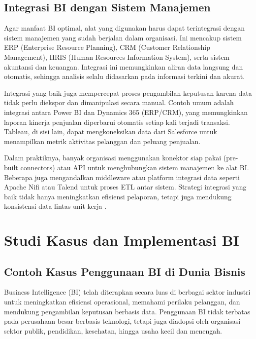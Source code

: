 \subsection{Integrasi BI dengan Sistem Manajemen}

Agar manfaat BI optimal, alat yang digunakan harus dapat terintegrasi dengan sistem manajemen yang sudah berjalan dalam organisasi. Ini mencakup sistem ERP (Enterprise Resource Planning), CRM (Customer Relationship Management), HRIS (Human Resources Information System), serta sistem akuntansi dan keuangan. Integrasi ini memungkinkan aliran data langsung dan otomatis, sehingga analisis selalu didasarkan pada informasi terkini dan akurat.

Integrasi yang baik juga mempercepat proses pengambilan keputusan karena data tidak perlu diekspor dan dimanipulasi secara manual. Contoh umum adalah integrasi antara Power BI dan Dynamics 365 (ERP/CRM), yang memungkinkan laporan kinerja penjualan diperbarui otomatis setiap kali terjadi transaksi. Tableau, di sisi lain, dapat mengkoneksikan data dari Salesforce untuk menampilkan metrik aktivitas pelanggan dan peluang penjualan.

Dalam praktiknya, banyak organisasi menggunakan konektor siap pakai (pre-built connectors) atau API untuk menghubungkan sistem manajemen ke alat BI. Beberapa juga mengandalkan middleware atau platform integrasi data seperti Apache Nifi atau Talend untuk proses ETL antar sistem. Strategi integrasi yang baik tidak hanya meningkatkan efisiensi pelaporan, tetapi juga mendukung konsistensi data lintas unit kerja \cite{elbashir2008enterprise}.



\section{Studi Kasus dan Implementasi BI}
\subsection{Contoh Kasus Penggunaan BI di Dunia Bisnis}

Business Intelligence (BI) telah diterapkan secara luas di berbagai sektor industri untuk meningkatkan efisiensi operasional, memahami perilaku pelanggan, dan mendukung pengambilan keputusan berbasis data. Penggunaan BI tidak terbatas pada perusahaan besar berbasis teknologi, tetapi juga diadopsi oleh organisasi sektor publik, pendidikan, kesehatan, hingga usaha kecil dan menengah.

